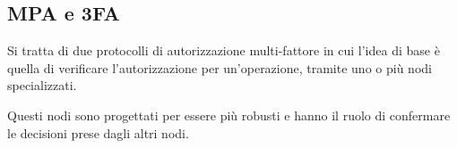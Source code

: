 \subsection{MPA e 3FA}
Si tratta di due protocolli di autorizzazione multi-fattore in cui l'idea di base è quella di verificare
l'autorizzazione per un'operazione, tramite uno o più nodi specializzati.

Questi nodi sono progettati per essere più robusti e hanno il ruolo di confermare le decisioni prese dagli altri nodi.
